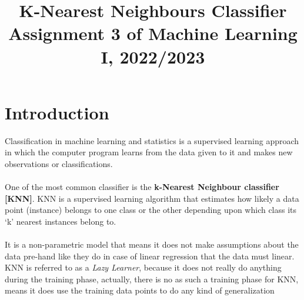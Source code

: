 \documentclass[10pt]{article}
\begin{document}
\noindent



\title{K-Nearest Neighbours Classifier\\Assignment 3 of Machine Learning I, 2022/2023}




\maketitle



\section{Introduction}
Classification in machine learning and statistics is a supervised learning approach in which the computer program learns from the data given to it and makes new observations or classifications.
\\\\One of the most common classifier is the \textbf{k-Nearest Neighbour
classifier [KNN]}. KNN is a supervised learning algorithm that estimates how likely a data point (instance) belongs to one class or the other depending upon which class its ‘k’ nearest instances belong to. \\\\It is a non-parametric model that means it does not make assumptions about the data pre-hand like they do in case of linear regression that the data must linear. KNN is referred to as a \textit{Lazy Learner}, because it does not really do anything during the training phase, actually, there is no as such a training phase for KNN, means it does use the training data points to do any kind of generalization
\end{document}

